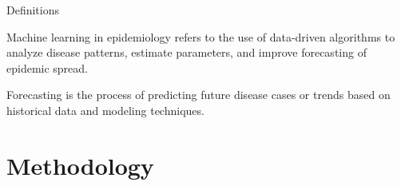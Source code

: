 \documentclass{beamer}
\begin{document}
\begin{frame}[allowframebreaks]{Definitions}
\begin{definition}
Machine learning in epidemiology refers to the use of data-driven algorithms to analyze disease patterns, estimate parameters, and improve forecasting of epidemic spread.
\end{definition}

\begin{definition}
Forecasting is the process of predicting future disease cases or trends based on historical data and modeling techniques.
\end{definition}

\end{frame}

\section{Methodology}
\end{document}
